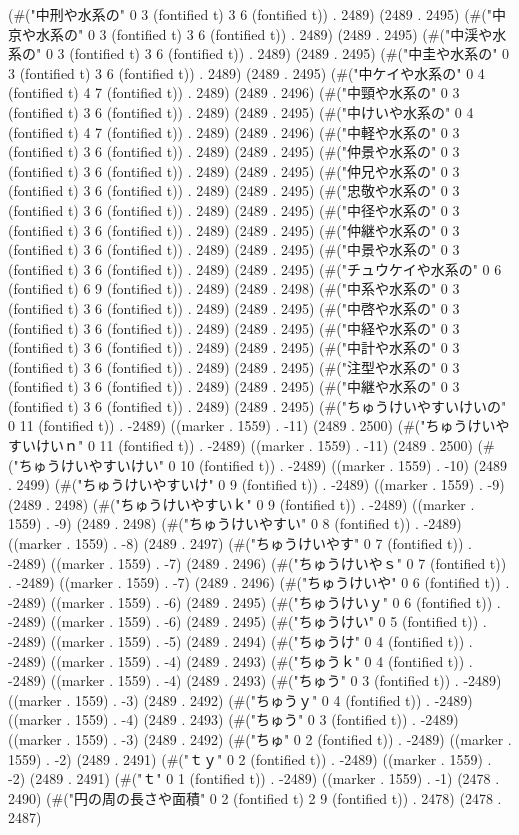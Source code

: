{(#("中刑や水系の" 0 3 (fontified t) 3 6 (fontified t)) . 2489) (2489 . 2495) (#("中京や水系の" 0 3 (fontified t) 3 6 (fontified t)) . 2489) (2489 . 2495) (#("中渓や水系の" 0 3 (fontified t) 3 6 (fontified t)) . 2489) (2489 . 2495) (#("中圭や水系の" 0 3 (fontified t) 3 6 (fontified t)) . 2489) (2489 . 2495) (#("中ケイや水系の" 0 4 (fontified t) 4 7 (fontified t)) . 2489) (2489 . 2496) (#("中頸や水系の" 0 3 (fontified t) 3 6 (fontified t)) . 2489) (2489 . 2495) (#("中けいや水系の" 0 4 (fontified t) 4 7 (fontified t)) . 2489) (2489 . 2496) (#("中軽や水系の" 0 3 (fontified t) 3 6 (fontified t)) . 2489) (2489 . 2495) (#("仲景や水系の" 0 3 (fontified t) 3 6 (fontified t)) . 2489) (2489 . 2495) (#("仲兄や水系の" 0 3 (fontified t) 3 6 (fontified t)) . 2489) (2489 . 2495) (#("忠敬や水系の" 0 3 (fontified t) 3 6 (fontified t)) . 2489) (2489 . 2495) (#("中径や水系の" 0 3 (fontified t) 3 6 (fontified t)) . 2489) (2489 . 2495) (#("仲継や水系の" 0 3 (fontified t) 3 6 (fontified t)) . 2489) (2489 . 2495) (#("中景や水系の" 0 3 (fontified t) 3 6 (fontified t)) . 2489) (2489 . 2495) (#("チュウケイや水系の" 0 6 (fontified t) 6 9 (fontified t)) . 2489) (2489 . 2498) (#("中系や水系の" 0 3 (fontified t) 3 6 (fontified t)) . 2489) (2489 . 2495) (#("中啓や水系の" 0 3 (fontified t) 3 6 (fontified t)) . 2489) (2489 . 2495) (#("中経や水系の" 0 3 (fontified t) 3 6 (fontified t)) . 2489) (2489 . 2495) (#("中計や水系の" 0 3 (fontified t) 3 6 (fontified t)) . 2489) (2489 . 2495) (#("注型や水系の" 0 3 (fontified t) 3 6 (fontified t)) . 2489) (2489 . 2495) (#("中継や水系の" 0 3 (fontified t) 3 6 (fontified t)) . 2489) (2489 . 2495) (#("ちゅうけいやすいけいの" 0 11 (fontified t)) . -2489) ((marker . 1559) . -11) (2489 . 2500) (#("ちゅうけいやすいけいｎ" 0 11 (fontified t)) . -2489) ((marker . 1559) . -11) (2489 . 2500) (#("ちゅうけいやすいけい" 0 10 (fontified t)) . -2489) ((marker . 1559) . -10) (2489 . 2499) (#("ちゅうけいやすいけ" 0 9 (fontified t)) . -2489) ((marker . 1559) . -9) (2489 . 2498) (#("ちゅうけいやすいｋ" 0 9 (fontified t)) . -2489) ((marker . 1559) . -9) (2489 . 2498) (#("ちゅうけいやすい" 0 8 (fontified t)) . -2489) ((marker . 1559) . -8) (2489 . 2497) (#("ちゅうけいやす" 0 7 (fontified t)) . -2489) ((marker . 1559) . -7) (2489 . 2496) (#("ちゅうけいやｓ" 0 7 (fontified t)) . -2489) ((marker . 1559) . -7) (2489 . 2496) (#("ちゅうけいや" 0 6 (fontified t)) . -2489) ((marker . 1559) . -6) (2489 . 2495) (#("ちゅうけいｙ" 0 6 (fontified t)) . -2489) ((marker . 1559) . -6) (2489 . 2495) (#("ちゅうけい" 0 5 (fontified t)) . -2489) ((marker . 1559) . -5) (2489 . 2494) (#("ちゅうけ" 0 4 (fontified t)) . -2489) ((marker . 1559) . -4) (2489 . 2493) (#("ちゅうｋ" 0 4 (fontified t)) . -2489) ((marker . 1559) . -4) (2489 . 2493) (#("ちゅう" 0 3 (fontified t)) . -2489) ((marker . 1559) . -3) (2489 . 2492) (#("ちゅうｙ" 0 4 (fontified t)) . -2489) ((marker . 1559) . -4) (2489 . 2493) (#("ちゅう" 0 3 (fontified t)) . -2489) ((marker . 1559) . -3) (2489 . 2492) (#("ちゅ" 0 2 (fontified t)) . -2489) ((marker . 1559) . -2) (2489 . 2491) (#("ｔｙ" 0 2 (fontified t)) . -2489) ((marker . 1559) . -2) (2489 . 2491) (#("ｔ" 0 1 (fontified t)) . -2489) ((marker . 1559) . -1) (2478 . 2490) (#("円の周の長さや面積" 0 2 (fontified t) 2 9 (fontified t)) . 2478) (2478 . 2487) }
